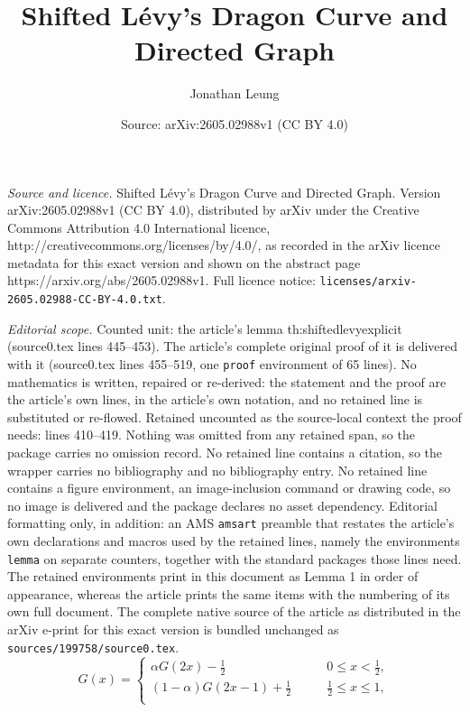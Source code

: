 \documentclass[10pt,a4paper]{amsart}
\title{Shifted L\'evy's Dragon Curve and Directed Graph}
\author{Jonathan Leung}
\date{Source: arXiv:2605.02988v1 (CC BY 4.0)}
\begin{document}
\maketitle

\noindent\emph{Source and licence.} Shifted L\'evy's Dragon Curve and Directed Graph. Version arXiv:2605.02988v1 (CC BY 4.0), distributed by arXiv under the Creative Commons Attribution 4.0 International licence, http://creativecommons.org/licenses/by/4.0/, as recorded in the arXiv licence metadata for this exact version and shown on the abstract page https://arxiv.org/abs/2605.02988v1. Full licence notice: \texttt{licenses/arxiv-2605.02988-CC-BY-4.0.txt}.\par\smallskip

\noindent\textit{Editorial scope.} Counted unit: the article's lemma th:shiftedlevyexplicit (source0.tex lines 445--453). The article's complete original proof of it is delivered with it (source0.tex lines 455--519, one \texttt{proof} environment of 65 lines). No mathematics is written, repaired or re-derived: the statement and the proof are the article's own lines, in the article's own notation, and no retained line is substituted or re-flowed.  Retained uncounted as the source-local context the proof needs: lines 410--419.  Nothing was omitted from any retained span, so the package carries no omission record.  No retained line contains a citation, so the wrapper carries no bibliography and no bibliography entry.  No retained line contains a figure environment, an image-inclusion command or drawing code, so no image is delivered and the package declares no asset dependency.  Editorial formatting only, in addition: an AMS \texttt{amsart} preamble that restates the article's own declarations and macros used by the retained lines, namely the environments \texttt{lemma} on separate counters, together with the standard packages those lines need.  The retained environments print in this document as Lemma 1 in order of appearance, whereas the article prints the same items with the numbering of its own full document.  The complete native source of the article as distributed in the arXiv e-print for this exact version is bundled unchanged as \texttt{sources/199758/source0.tex}.
\begin{equation}
\label{eq:s-functional}
 G(x) =
\begin{cases}
 \alpha G(2x) - \frac{1}{2}
                     &\qquad 0 \leq x < \frac{1}{2}, \\
(1-\alpha) G(2x-1) + \frac{1}{2} & \qquad \frac{1}{2} \leq x \leq 1,\\
 
 \end{cases}
 \end{equation}
\end{document}
